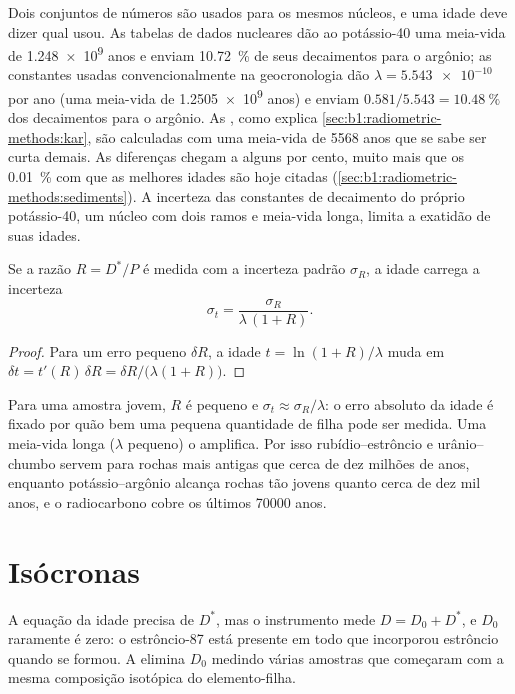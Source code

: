 Dois conjuntos de números são usados para os mesmos núcleos, e uma idade deve dizer qual usou.
As tabelas de dados nucleares dão ao potássio-40 uma meia-vida de \num{1.248e9} anos e enviam
\qty{10.72}{\percent} de seus decaimentos para o argônio; as constantes usadas convencionalmente
na geocronologia dão $\lambda = \num{5.543e-10}$ por ano (uma meia-vida de \num{1.2505e9}
anos) e enviam $0.581/5.543 = \qty{10.48}{\percent}$ dos decaimentos para o argônio. As , como explica \cref{sec:b1:radiometric-methods:kar}, são calculadas com uma
meia-vida de \num{5568} anos que se sabe ser curta demais. As diferenças chegam a alguns por
cento, muito mais que os \qty{0.01}{\percent} com que as melhores idades são hoje citadas
(\cref{sec:b1:radiometric-methods:sediments}). A incerteza das constantes de decaimento do
próprio potássio-40, um núcleo com dois ramos e meia-vida longa, limita a exatidão de suas idades.

\begin{proposition}\label{prop:b1:radiometric-methods:precision}
Se a razão $R = D^*/P$ é medida com a incerteza padrão $\sigma_R$, a idade carrega a incerteza
\[
  \sigma_t = \frac{\sigma_R}{\lambda\,(1 + R)}.
\]
\end{proposition}

\begin{proof}
Para um erro pequeno $\delta R$, a idade $t = \ln(1+R)/\lambda$ muda em
$\delta t = t'(R)\,\delta R = \delta R/\bigl(\lambda(1 + R)\bigr)$.
\end{proof}

Para uma amostra jovem, $R$ é pequeno e $\sigma_t \approx \sigma_R/\lambda$: o erro absoluto da
idade é fixado por quão bem uma pequena quantidade de filha pode ser medida. Uma meia-vida longa
($\lambda$ pequeno) o amplifica. Por isso rubídio--estrôncio e urânio--chumbo servem para rochas mais
antigas que cerca de dez milhões de anos, enquanto potássio--argônio alcança rochas tão jovens
quanto cerca de dez mil anos, e o radiocarbono cobre os últimos \num{70000} anos.

\section{Isócronas}\label{sec:b1:radiometric-methods:isochrons}

A equação da idade precisa de $D^*$, mas o instrumento mede $D = D_0 + D^*$, e $D_0$ raramente
é zero: o estrôncio-87 está presente em todo  que incorporou estrôncio quando se formou.
A  elimina $D_0$ medindo várias amostras que começaram com a mesma composição isotópica
do elemento-filha.

